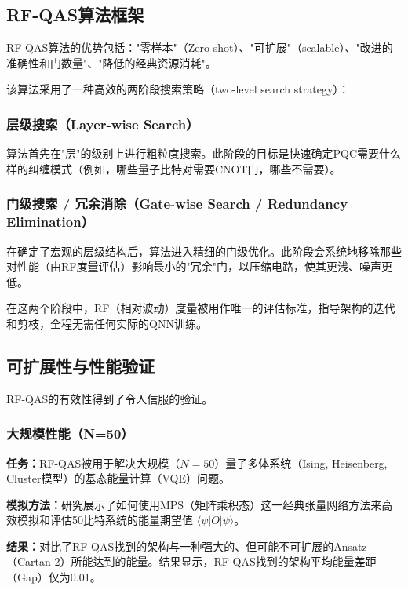 \documentclass[12pt,a4paper]{article}
\begin{document}
\subsection{RF-QAS算法框架}

RF-QAS算法的优势包括："零样本"（Zero-shot）、"可扩展"（scalable）、"改进的准确性和门数量"、"降低的经典资源消耗"。

该算法采用了一种高效的两阶段搜索策略（two-level search strategy）：

\subsubsection{层级搜索（Layer-wise Search）}

算法首先在"层"的级别上进行粗粒度搜索。此阶段的目标是快速确定PQC需要什么样的纠缠模式（例如，哪些量子比特对需要CNOT门，哪些不需要）。

\subsubsection{门级搜索 / 冗余消除（Gate-wise Search / Redundancy Elimination）}

在确定了宏观的层级结构后，算法进入精细的门级优化。此阶段会系统地移除那些对性能（由RF度量评估）影响最小的"冗余"门，以压缩电路，使其更浅、噪声更低。

在这两个阶段中，RF（相对波动）度量被用作唯一的评估标准，指导架构的迭代和剪枝，全程无需任何实际的QNN训练。

\subsection{可扩展性与性能验证}

RF-QAS的有效性得到了令人信服的验证。

\subsubsection{大规模性能（N=50）}

\textbf{任务：}RF-QAS被用于解决大规模（$N=50$）量子多体系统（Ising, Heisenberg, Cluster模型）的基态能量计算（VQE）问题。

\textbf{模拟方法：}研究展示了如何使用MPS（矩阵乘积态）这一经典张量网络方法来高效模拟和评估50比特系统的能量期望值 $\langle \psi | O | \psi \rangle$。

\textbf{结果：}对比了RF-QAS找到的架构与一种强大的、但可能不可扩展的Ansatz（Cartan-2）所能达到的能量。结果显示，RF-QAS找到的架构平均能量差距（Gap）仅为0.01。
\end{document}
